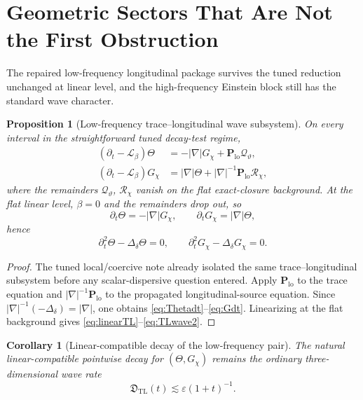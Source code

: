 \documentclass[11pt]{article}
\newcommand{\Ell}{\mathcal{L}}
\newtheorem{proposition}{Proposition}
\newtheorem{corollary}{Corollary}
\begin{document}
\section{Geometric Sectors That Are Not the First Obstruction}

The repaired low-frequency longitudinal package survives the tuned reduction unchanged at linear level, and the high-frequency Einstein block still has the standard wave character.

\begin{proposition}[Low-frequency trace--longitudinal wave subsystem]
\label{prop:TLwave}
On every interval in the straightforward tuned decay-test regime,
\begin{align}
(\partial_t-\Ell_\beta)\Theta
&=
-|\nabla|G_\chi + \mathbf P_{\mathrm{lo}}\mathcal Q_\vartheta,
\label{eq:Thetadt}
\\
(\partial_t-\Ell_\beta)G_\chi
&=
|\nabla|\Theta + |\nabla|^{-1}\mathbf P_{\mathrm{lo}}\mathcal R_\chi,
\label{eq:Gdt}
\end{align}
where the remainders \(\mathcal Q_\vartheta\), \(\mathcal R_\chi\) vanish on the flat exact-closure background. At the flat linear level, \(\beta=0\) and the remainders drop out, so
\begin{equation}
\partial_t\Theta = -|\nabla|G_\chi,
\qquad
\partial_tG_\chi = |\nabla|\Theta,
\label{eq:linearTL}
\end{equation}
hence
\begin{equation}
\partial_t^2\Theta-\Delta_\delta\Theta = 0,
\qquad
\partial_t^2G_\chi-\Delta_\delta G_\chi = 0.
\label{eq:TLwave2}
\end{equation}
\end{proposition}

\begin{proof}
The tuned local/coercive note already isolated the same trace--longitudinal subsystem before any scalar-dispersive question entered. Apply \(\mathbf P_{\mathrm{lo}}\) to the trace equation and \(|\nabla|^{-1}\mathbf P_{\mathrm{lo}}\) to the propagated longitudinal-source equation. Since \(|\nabla|^{-1}(-\Delta_\delta)=|\nabla|\), one obtains \eqref{eq:Thetadt}--\eqref{eq:Gdt}. Linearizing at the flat background gives \eqref{eq:linearTL}--\eqref{eq:TLwave2}.
\end{proof}

\begin{corollary}[Linear-compatible decay of the low-frequency pair]
\label{cor:TLdecay}
The natural linear-compatible pointwise decay for \((\Theta,G_\chi)\) remains the ordinary three-dimensional wave rate
\begin{equation}
\mathfrak D_{\mathrm{TL}}(t)\lesssim \varepsilon(1+t)^{-1}.
\label{eq:TLrate}
\end{equation}
\end{corollary}
\end{document}
